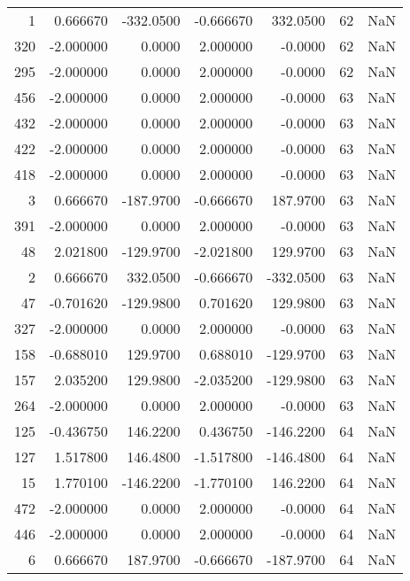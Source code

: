 \begin{tabular}{rrrrrrr}
  1 &    0.666670 & -332.0500 &   -0.666670 &    332.0500 &          62 & NaN \\
320 &   -2.000000 &    0.0000 &    2.000000 &     -0.0000 &          62 & NaN \\
295 &   -2.000000 &    0.0000 &    2.000000 &     -0.0000 &          62 & NaN \\
456 &   -2.000000 &    0.0000 &    2.000000 &     -0.0000 &          63 & NaN \\
432 &   -2.000000 &    0.0000 &    2.000000 &     -0.0000 &          63 & NaN \\
422 &   -2.000000 &    0.0000 &    2.000000 &     -0.0000 &          63 & NaN \\
418 &   -2.000000 &    0.0000 &    2.000000 &     -0.0000 &          63 & NaN \\
  3 &    0.666670 & -187.9700 &   -0.666670 &    187.9700 &          63 & NaN \\
391 &   -2.000000 &    0.0000 &    2.000000 &     -0.0000 &          63 & NaN \\
 48 &    2.021800 & -129.9700 &   -2.021800 &    129.9700 &          63 & NaN \\
  2 &    0.666670 &  332.0500 &   -0.666670 &   -332.0500 &          63 & NaN \\
 47 &   -0.701620 & -129.9800 &    0.701620 &    129.9800 &          63 & NaN \\
327 &   -2.000000 &    0.0000 &    2.000000 &     -0.0000 &          63 & NaN \\
158 &   -0.688010 &  129.9700 &    0.688010 &   -129.9700 &          63 & NaN \\
157 &    2.035200 &  129.9800 &   -2.035200 &   -129.9800 &          63 & NaN \\
264 &   -2.000000 &    0.0000 &    2.000000 &     -0.0000 &          63 & NaN \\
125 &   -0.436750 &  146.2200 &    0.436750 &   -146.2200 &          64 & NaN \\
127 &    1.517800 &  146.4800 &   -1.517800 &   -146.4800 &          64 & NaN \\
 15 &    1.770100 & -146.2200 &   -1.770100 &    146.2200 &          64 & NaN \\
472 &   -2.000000 &    0.0000 &    2.000000 &     -0.0000 &          64 & NaN \\
446 &   -2.000000 &    0.0000 &    2.000000 &     -0.0000 &          64 & NaN \\
  6 &    0.666670 &  187.9700 &   -0.666670 &   -187.9700 &          64 & NaN \\

\end{tabular}
